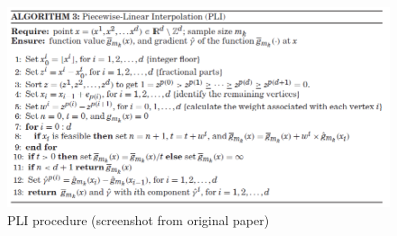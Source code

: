 \documentclass[12pt,a4paper]{article}
\begin{document}
\begin{figure}
  \centering
  \includegraphics[scale=0.7]{pli.png}
  \caption{PLI procedure (screenshot from original paper)}
  \label{fig:pli}
\end{figure}
\end{document}
